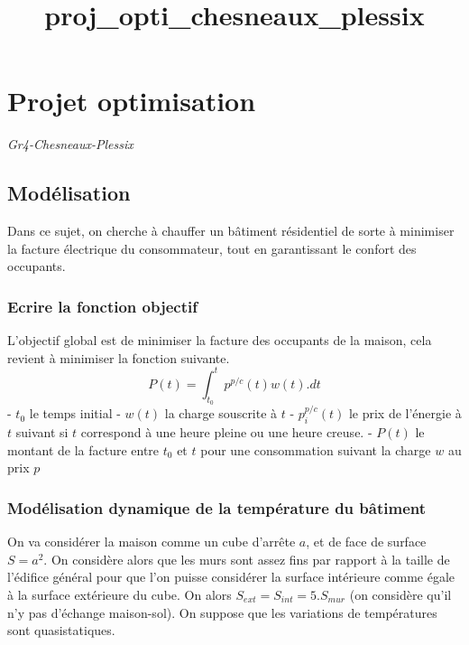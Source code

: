 \documentclass[11pt]{article}
\title{proj\_opti\_chesneaux\_plessix}
\begin{document}
    
    \maketitle
    
    

    
    \hypertarget{projet-optimisation}{%
\section{Projet optimisation}\label{projet-optimisation}}

\emph{Gr4-Chesneaux-Plessix}

\hypertarget{moduxe9lisation}{%
\subsection{Modélisation}\label{moduxe9lisation}}

Dans ce sujet, on cherche à chauffer un bâtiment résidentiel de sorte à
minimiser la facture électrique du consommateur, tout en garantissant le
confort des occupants.

\hypertarget{ecrire-la-fonction-objectif}{%
\subsubsection{Ecrire la fonction
objectif}\label{ecrire-la-fonction-objectif}}

L'objectif global est de minimiser la facture des occupants de la
maison, cela revient à minimiser la fonction suivante.
\[\boxed{P(t)= \int_{t_0}^{t}{p}^{p/c}(t)w(t).dt}\] - \(t_0\) le temps
initial - \(w(t)\) la charge souscrite à \(t\) - \(p_i^{p/c}(t)\) le
prix de l'énergie à \(t\) suivant si \(t\) correspond à une heure pleine
ou une heure creuse. - \(P(t)\) le montant de la facture entre \(t_0\)
et \(t\) pour une consommation suivant la charge \(w\) au prix \(p\)

\hypertarget{moduxe9lisation-dynamique-de-la-tempuxe9rature-du-buxe2timent}{%
\subsubsection{Modélisation dynamique de la température du
bâtiment}\label{moduxe9lisation-dynamique-de-la-tempuxe9rature-du-buxe2timent}}

On va considérer la maison comme un cube d'arrête \(a\), et de face de
surface \(S=a^2\). On considère alors que les murs sont assez fins par
rapport à la taille de l'édifice général pour que l'on puisse considérer
la surface intérieure comme égale à la surface extérieure du cube. On
alors \(S_{ext} = S_{int} = 5.S_{mur}\) (on considère qu'il n'y pas
d'échange maison-sol). On suppose que les variations de températures
sont quasistatiques.
\end{document}
